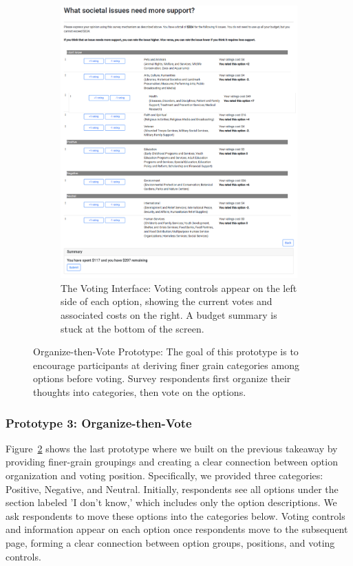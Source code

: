 \begin{figure}[h]
\begin{subfigure}[b]{0.48\textwidth}
        \includegraphics[width=\textwidth]{content/image/prototypes/4.2_grouping_vote.png}
        \caption{The Voting Interface: Voting controls appear on the left side of each option, showing the current votes and associated costs on the right. A budget summary is stuck at the bottom of the screen.}
        \label{fig:qv_org_p2}
    \end{subfigure}
    \caption{Organize-then-Vote Prototype: The goal of this prototype is to encourage participants at deriving finer grain categories among options before voting. Survey respondents first organize their thoughts into categories, then vote on the options.}
    \label{fig:qv_org}
\end{figure}

\subsubsection{Prototype 3: Organize-then-Vote}
Figure~\ref{fig:qv_org} shows the last prototype where we built on the previous takeaway by providing finer-grain groupings and creating a clear connection between option organization and voting position. Specifically, we provided three categories: Positive, Negative, and Neutral. Initially, respondents see all options under the section labeled 'I don't know,' which includes only the option descriptions. We ask respondents to move these options into the categories below. Voting controls and information appear on each option once respondents move to the subsequent page, forming a clear connection between option groups, positions, and voting controls.

